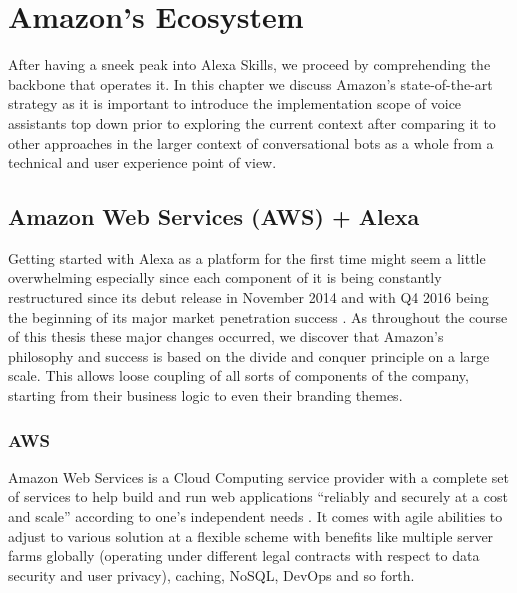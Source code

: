 







\chapter{Amazon's Ecosystem}
\label{amznecosys}

%



After having a sneek peak into Alexa Skills, we proceed by comprehending the backbone that operates it.
In this chapter we discuss Amazon's state-of-the-art strategy
as it is important to introduce the implementation scope of voice assistants 
top down
prior to exploring the current context 
after comparing it to other approaches in the larger context of conversational bots as a whole from a technical and user experience point of view. 


\section[Amazon Web Services + Alexa]{Amazon Web Services (AWS) + Alexa}


Getting started with Alexa as a platform for the first time might seem a little overwhelming especially since each component of it is being  constantly restructured since its debut release in November 2014 and with Q4 2016 being the beginning of its major market penetration success \cite{gartnerpreds17}. %
As throughout the course of this thesis these major changes occurred, we discover that Amazon's philosophy and success is based on the divide and conquer principle on  a large scale. This allows loose coupling of all sorts of components of the company, starting from their business logic to even their branding themes. %
 

\subsection*{AWS}
Amazon Web Services is a Cloud Computing service provider with a complete set of services to help build and run web applications ``reliably and securely at a cost and scale'' according to one's independent needs \cite{aws_website}.
It comes with agile abilities to adjust to various solution at a flexible scheme with benefits like multiple server farms globally (operating under different legal contracts with respect to data security and user privacy), caching, NoSQL, DevOps and so forth.


